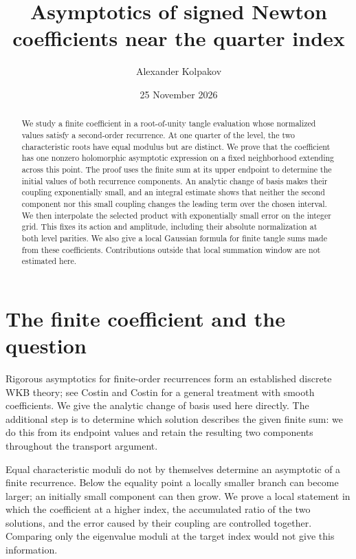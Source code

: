 \documentclass[11pt]{article}
\title{Asymptotics of signed Newton coefficients near the quarter index}
\author{Alexander Kolpakov}\date{25 November 2026}
\numberwithin{equation}{section}
\theoremstyle{remark}\newtheorem{remark}[theorem]{Remark}
\begin{document}
\maketitle

\begin{abstract}
We study a finite coefficient in a root-of-unity tangle evaluation
whose normalized values satisfy a second-order recurrence. At one
quarter of the level, the two characteristic roots have equal modulus
but are distinct. We prove that the coefficient has one nonzero
holomorphic asymptotic expression on a fixed neighborhood extending
across this point. The proof uses the finite sum at its upper endpoint
to determine the initial values of both recurrence components. An
analytic change of basis makes their coupling exponentially small,
and an integral estimate shows that neither the second component nor
this small coupling changes the leading term over the chosen interval.
We then interpolate the selected product with exponentially small
error on the integer grid. This fixes its action and amplitude,
including their absolute normalization at both level parities. We also
give a local Gaussian formula for finite tangle sums made from these
coefficients. Contributions outside that local summation window are
not estimated here.
\end{abstract}

\section{The finite coefficient and the question}\label{qi:intro}

Rigorous asymptotics for finite-order recurrences form an established discrete WKB theory; see Costin and Costin \cite{CostinCostin} for a general treatment with smooth coefficients. We give the analytic change of basis used here directly. The additional
step is to determine which solution describes the given finite sum:
we do this from its endpoint values and retain the resulting two
components throughout the transport argument.

Equal characteristic moduli do not by themselves determine an asymptotic of a finite recurrence. Below the equality point a locally smaller branch can become larger; an initially small component can then grow. We prove a local statement in which the coefficient at a higher index, the accumulated ratio of the two
solutions, and the error caused by their coupling are controlled
together. Comparing only the eigenvalue moduli at the target index
would not give this information.
\end{document}
